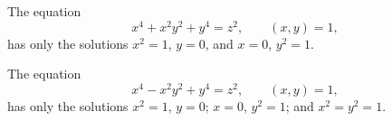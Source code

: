 \begin{proposition}
    The equation
\[
    x^4+x^2y^2+y^4=z^2,\qquad (x,y)=1,
\]
    has only the solutions $x^2=1$, $y=0$, and $x=0$, $y^2=1$.
\end{proposition}

\begin{proposition}
    The equation
\[
    x^4-x^2y^2+y^4=z^2,\qquad (x,y)=1,
\]
    has only the solutions $x^2=1$, $y=0$; $x=0$, $y^2=1$; and $x^2=y^2=1$.
\end{proposition}
